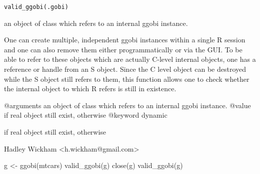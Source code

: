 \begin{Description}\relax
\end{Description}
\begin{Usage}
\begin{verbatim}valid_ggobi(.gobi)\end{verbatim}
\end{Usage}
\begin{Arguments}
\begin{ldescription}
\item[\code{.gobi}] an object of class  which refers to an internal ggobi instance.
\end{ldescription}
\end{Arguments}
\begin{Details}\relax
One can create multiple, independent ggobi instances within a single
R session and one can also remove them either programmatically or
via the GUI.  To be able to refer to these objects which are
actually C-level internal objects, one has a reference or handle
from an S object. Since the C level object can be destroyed while the S
object still refers to them, this function allows one to check whether the
internal object to which R refers is still in existence.

@arguments an object of class  which refers to an internal ggobi instance.
@value  if real object still exist,  otherwise
@keyword dynamic
\end{Details}
\begin{Value}
 if real object still exist,  otherwise
\end{Value}
\begin{Author}\relax
Hadley Wickham <h.wickham@gmail.com>
\end{Author}
\begin{Examples}
\begin{ExampleCode}g <- ggobi(mtcars)
valid_ggobi(g)
close(g)
valid_ggobi(g) \end{ExampleCode}
\end{Examples}

